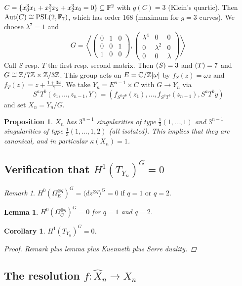 \documentclass[A4paper, british, reqno]{amsart}
\theoremstyle{darkgreentheorem}
\newtheorem{lm}[thm]{Lemma}
\newtheorem{prop}[thm]{Proposition}
\newtheorem{cor}[thm]{Corollary}
\theoremstyle{darkbluedefinition}
\theoremstyle{darkredexample}
\theoremstyle{remark}
\newtheorem{rem}[thm]{Remark}
\DeclareMathOperator{\ord}{ord}
\DeclareMathOperator{\Aut}{Aut}
\let\ord\relax
\DeclareMathOperator{\ord}{ord}
\newcommand{\1}{\mathbbm{1}}
\newcommand{\ot}{\otimes}
\newcommand{\tms}{\times}
\newcommand{\sub}{\subseteq}
\begin{document}
$C=\{x_{0}^{3}x_{1}+x_{1}^{3}x_{2}+x_{2}^{3}x_{0}=0\}\sub \P^{2}$ with $g(C)=3$ (Klein's quartic).
Then $\Aut(C)\cong \operatorname{PSL}(2,\bbF_{7})$, which has order 168 (maximum for $g=3$ curves).
We choose $\lambda^{7}=1$ and
\[ G=\left\langle \begin{pmatrix} 0 & 1 & 0 \\ 0 & 0 & 1 \\ 1 & 0 & 0 \end{pmatrix},
    \begin{pmatrix} \lambda^{4} & 0 & 0 \\ 0 & \lambda^{2} & 0 \\ 0 & 0 & \lambda \end{pmatrix}\right\rangle \]
Call $S$ resp. $T$ the first resp. second matrix.
Then $\ord(S)=3$ and $\ord(T)=7$ and $G\cong \Z/7\Z\tms \Z/3\Z$.
This group acts on $E=\mathbb{C}/\mathbb{Z}[\omega]$ by $f_{S}(z)=\omega z$ and $f_{T}(z)=z+\frac{1+3\omega}{7}$.
We take $Y_{n}=E^{n-1}\tms C$ with $G\to Y_{n}$ via
\[ S^{a}T^{b}(z_{1},\ldots,z_{n-1},Y)=(f_{S^{a}T^{b}}(z_{1}),\ldots, f_{S^{a}T^{b}}(z_{n-1}),S^{a}T^{b}y) \]
and set $X_{n}=Y_{n}/G$.

\begin{prop}
    $X_{n}$ has $3^{n-1}$ singularities of type $\frac{1}{3}(1,\ldots,1)$ and $3^{n-1}$ singularities of type $\frac{1}{3}(1,\ldots,1,2)$ (all isolated).
    This implies that they are canonical, and in particular $\kappa(X_{n})=1$.
\end{prop}

\subsection{Verification that $H^{1}(T_{Y_{n}})^{G}=0$}

\begin{rem}
    $H^{0}(\Omega_{E}^{\ot q})^{G}=\langle dz^{\ot q} \rangle^{G}=0$ if $q=1$ or $q=2$.
\end{rem}

\begin{lm}
    $H^{0}(\Omega_{C}^{\ot q})^{G}=0$ for $q=1$ and $q=2$.
\end{lm}

\begin{cor}
    $H^{1}(T_{Y_{n}})^{G}=0$.
    \begin{proof}
	Remark plus lemma plus Kuenneth plus Serre duality.
    \end{proof}
\end{cor}

\subsection{The resolution $f\colon \hat{X}_{n}\to X_{n}$}
\end{document}
